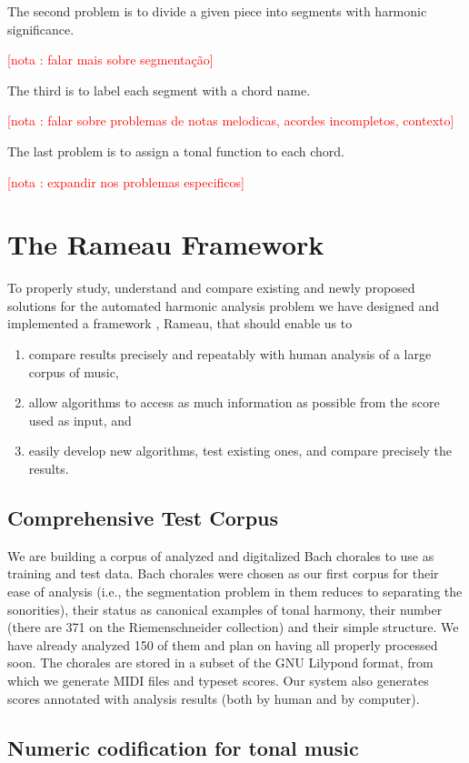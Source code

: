 \documentclass{article}
\newcounter{notacounter}
\newcommand{\nota}[1]{
  \addtocounter{notacounter}{1}
  \textcolor{red}{[nota \arabic{notacounter}: #1]}
}
\begin{document}
The second problem is to divide a given piece into segments with
harmonic significance. \nota{falar mais sobre segmentação}

The third is to label each segment with a chord name. \nota{falar
  sobre problemas de notas melodicas, acordes incompletos, contexto}

The last problem is to assign a tonal function to each chord.
\nota{expandir nos problemas especificos}

\section{The Rameau Framework}
\label{sec:system}

To properly study, understand and compare existing and newly proposed
solutions for the automated harmonic analysis problem we have designed
and implemented a framework , Rameau, that should enable us to

\begin{enumerate}
\item compare results precisely and repeatably with human analysis of
  a large corpus of music,
\item allow algorithms to access as much information as possible from
  the score used as input, and
\item easily develop new algorithms, test existing ones, and compare
  precisely the results.
\end{enumerate}

\subsection{Comprehensive Test Corpus}
\label{sec:comprehensive-test-corpus}

We are building a corpus of analyzed and digitalized Bach chorales to
use as training and test data. Bach chorales were chosen as our first
corpus for their ease of analysis (i.e., the segmentation problem in
them reduces to separating the sonorities), their status as canonical
examples of tonal harmony, their number (there are 371 on the
Riemenschneider collection) and their simple structure. We have
already analyzed 150 of them and plan on having all properly processed
soon. The chorales are stored in a subset of the GNU Lilypond
\cite{nienhuys:lilypond} format, from which we generate MIDI files and
typeset scores. Our system also generates scores annotated with
analysis results (both by human and by computer).

\subsection{Numeric codification for tonal music}
\label{sec:codificacao-jamary}
\end{document}
